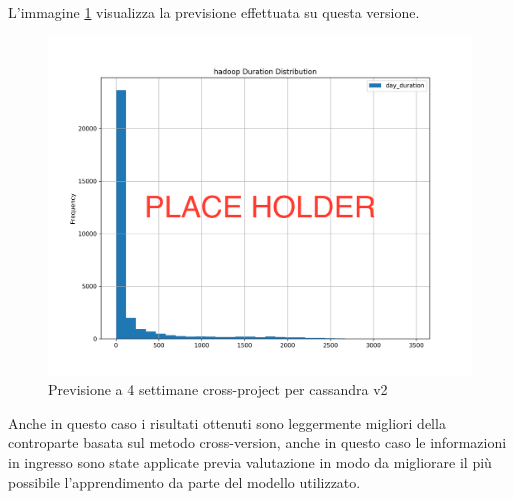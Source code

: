 \documentclass[%
    corpo=12pt,
    twoside,
    oldstyle,
    autoretitolo,
    greek,
    evenboxes,
]{toptesi}
\begin{document}
\begin{center}
   \label{tab:cross_project_hadoop}
\end{center}
L'immagine \ref{fig:cassandra_cp_nn_4w} visualizza la previsione effettuata su questa versione.
\begin{figure}[!ht]
  \includegraphics[width=\linewidth]{figure/place_holder.png}
  \caption{Previsione a 4 settimane cross-project per cassandra v2}
  \label{fig:cassandra_cp_nn_4w}
\end{figure}
Anche in questo caso i risultati ottenuti sono leggermente migliori della controparte basata sul metodo cross-version, anche in questo caso le informazioni in ingresso sono state applicate previa valutazione in modo da migliorare il più possibile l'apprendimento da parte del modello utilizzato.
\end{document}
